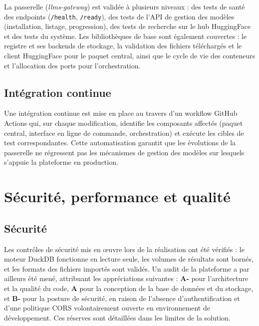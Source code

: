La passerelle (\textit{llms-gateway}) est validée à plusieurs niveaux : des tests de santé des endpoints (\texttt{/health}, \texttt{/ready}), des tests de l'API de gestion des modèles (installation, listage, progression), des tests de recherche sur le hub HuggingFace et des tests du système. Les bibliothèques de base sont également couvertes : le registre et ses backends de stockage, la validation des fichiers téléchargés et le client HuggingFace pour le paquet central, ainsi que le cycle de vie des conteneurs et l'allocation des ports pour l'orchestration.

\subsection{Intégration continue}

Une intégration continue est mise en place au travers d'un workflow GitHub Actions qui, sur chaque modification, identifie les composants affectés (paquet central, interface en ligne de commande, orchestration) et exécute les cibles de test correspondantes. Cette automatisation garantit que les évolutions de la passerelle ne régressent pas les mécanismes de gestion des modèles sur lesquels s'appuie la plateforme en production.

\section{Sécurité, performance et qualité}

\subsection{Sécurité}

Les contrôles de sécurité mis en œuvre lors de la réalisation ont été vérifiés : le moteur DuckDB fonctionne en lecture seule, les volumes de résultats sont bornés, et les formats des fichiers importés sont validés. Un audit de la plateforme a par ailleurs été mené, attribuant les appréciations suivantes : \textbf{A-} pour l'architecture et la qualité du code, \textbf{A} pour la conception de la base de données et du stockage, et \textbf{B-} pour la posture de sécurité, en raison de l'absence d'authentification et d'une politique CORS volontairement ouverte en environnement de développement. Ces réserves sont détaillées dans les limites de la solution.

